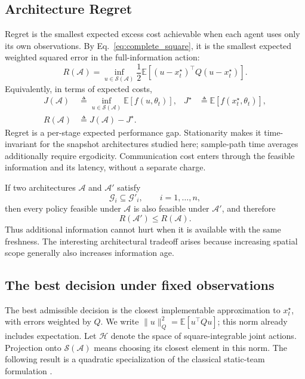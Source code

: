 \documentclass[11pt]{article}
\begin{document}
\subsection{Architecture Regret}
\label{subsec:architecture_regret}

Regret is the smallest expected excess cost achievable when each agent uses
only its own observations. By Eq.~\eqref{eq:complete_square}, it is the
smallest expected weighted squared error in the full-information action:
\[
R(\mathcal A)=\inf_{u\in\mathcal S(\mathcal A)}
\frac12\mathbb E[(u-x_t^\star)^\top Q(u-x_t^\star)].
\]
Equivalently, in terms of expected costs,
\begin{align}
J(\mathcal A)&\triangleq\inf_{u\in\mathcal S(\mathcal A)}\mathbb E[f(u,\theta_t)],
&J^\star&\triangleq\mathbb E[f(x_t^\star,\theta_t)],
\label{eq:architecture_cost}\\
R(\mathcal A)&\triangleq J(\mathcal A)-J^\star.
\label{eq:architecture_regret}
\end{align}
Regret is a per-stage expected performance gap. Stationarity makes it
time-invariant for the snapshot architectures studied here; sample-path
time averages additionally require ergodicity. Communication cost enters
through the feasible information and its latency, without a separate charge.

If two architectures $\mathcal{A}$ and $\mathcal{A}'$ satisfy
\begin{equation}
    \mathcal{G}_i
    \subseteq
    \mathcal{G}'_i,
    \qquad
    i=1,\ldots,n,
    \label{eq:info_inclusion}
\end{equation}
then every policy feasible under $\mathcal{A}$ is also feasible under
$\mathcal{A}'$, and therefore
\begin{equation}
    R(\mathcal{A}')
    \le
    R(\mathcal{A}).
    \label{eq:architecture_monotonicity}
\end{equation}
Thus additional information cannot hurt when it is available with the same
freshness. The interesting architectural tradeoff arises because increasing
spatial scope generally also increases information age.

\subsection{The best decision under fixed observations}
\label{subsec:projection}

The best admissible decision is the closest implementable approximation to
$x_t^\star$, with errors weighted by $Q$. We write
$\|u\|_Q^2=\mathbb E[u^\top Qu]$; this norm already includes expectation.
Let $\mathcal H$ denote the space of square-integrable joint actions.
Projection onto $\mathcal S(\mathcal A)$ means choosing its closest element
in this norm. The following result is a quadratic specialization of the
classical static-team formulation \cite{radner1962team,krainak1982staticII}.
\end{document}

